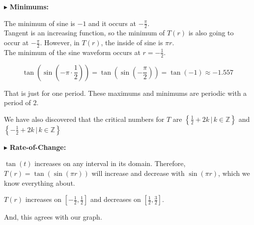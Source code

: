 \documentclass{ximera}
\begin{document}
$\blacktriangleright$ \textbf{\textcolor{blue!55!black}{Minimums: }}



The minimum of sine is $-1$ and it occurs at $-\frac{\pi}{2}$.\\

Tangent is an increasing function, so the minimum of $T(r)$ is also going to occur at $-\frac{\pi}{2}$. However, in $T(r)$, the inside of sine is $\pi r$.\\


The minimum of the sine waveform occurs at $r = -\frac{1}{2}$.


\[   \tan\left(\sin\left(-\pi \cdot \frac{1}{2}\right)\right)  =   \tan\left(\sin\left(-\frac{\pi}{2}\right)\right)  = \tan(-1)  \approx -1.557  \]




That is just for one period. These maximums and minimums are periodic with a period of $2$.







We have also discovered that the critical numbers for $T$ are $\left\{ \frac{1}{2} + 2k \, | \, k \in \mathbb{Z} \right\}$ and $\left\{ -\frac{1}{2} + 2k \, | \, k \in \mathbb{Z} \right\}$










$\blacktriangleright$ \textbf{\textcolor{blue!55!black}{Rate-of-Change: }} 


$\tan(t)$ increases on any interval in its domain.  Therefore, $T(r) = \tan(\sin(\pi r))$ will increase and decrease with $\sin(\pi r)$, which we know everything about.




$T(r)$ increases on $\left[ -\frac{1}{2}, \frac{1}{2} \right]$ and decreases on $\left[\frac{1}{2}, \frac{3}{2} \right]$.



And, this agrees with our graph.
\end{document}
